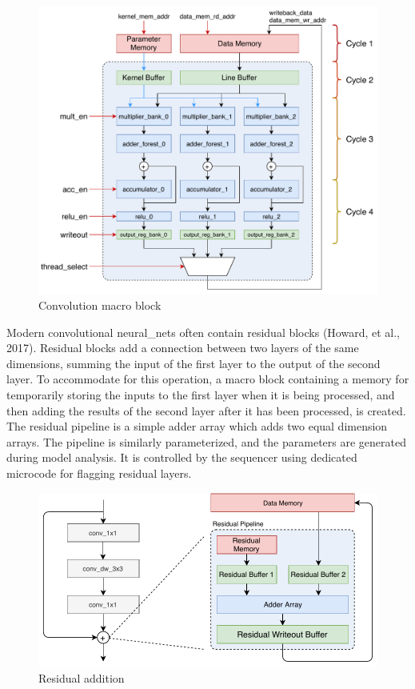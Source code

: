 \documentclass{uw-ece-wkrpt}
\begin{document}
\begin{figure}
\centering
\includegraphics[width=\textwidth]{figures/convolution_macro}
\caption{Convolution macro block \cite{Ma2017An-automatic-RT}}\label{fig:convolution_macro}
\end{figure}

Modern convolutional \glspl{neural_net} often contain residual blocks (Howard, et al., 2017). Residual blocks add a connection between two layers of the same dimensions, summing the input of the first layer to the output of the second layer. To accommodate for this operation, a macro block containing a memory for temporarily storing the inputs to the first layer when it is being processed, and then adding the results of the second layer after it has been processed, is created. The residual pipeline is a simple adder array which adds two equal dimension arrays. The pipeline is similarly parameterized, and the parameters are generated during model analysis. It is controlled by the sequencer using dedicated microcode for flagging residual layers.

\begin{figure}
\centering
\includegraphics[width=\textwidth]{figures/residual_addition}
\caption{Residual addition}\label{fig:residual_addition}
\end{figure}
\end{document}
